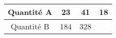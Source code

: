 \begin{tabular}{|c|c|c|c|}
\hline
Quantité A & 23 & 41 & 18 \\ \hline
Quantité B & 184 & 328 & \kern1cm \\ \hline
\end{tabular}

